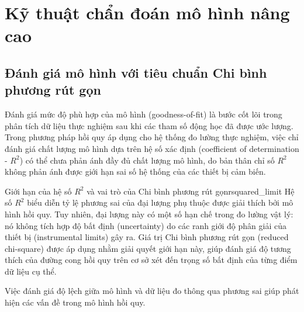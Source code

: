 \chapter{Kỹ thuật chẩn đoán mô hình nâng cao}

\section{Đánh giá mô hình với tiêu chuẩn Chi bình phương rút gọn}
\label{sec:reduced_chi_square}

Đánh giá mức độ phù hợp của mô hình (goodness-of-fit) là bước cốt lõi trong phân tích dữ liệu thực nghiệm sau khi các tham số động học đã được ước lượng. Trong phương pháp hồi quy áp dụng cho hệ thống đo lường thực nghiệm, việc chỉ đánh giá chất lượng mô hình dựa trên hệ số xác định (coefficient of determination - $R^2$) có thể chưa phản ánh đầy đủ chất lượng mô hình, do bản thân chỉ số $R^2$ không phản ánh được giới hạn sai số hệ thống của các thiết bị cảm biến.

\begin{physcore}{Giới hạn của hệ số $R^2$ và vai trò của Chi bình phương rút gọn}{rsquared_limit}
Hệ số $R^2$ biểu diễn tỷ lệ phương sai của đại lượng phụ thuộc được giải thích bởi mô hình hồi quy. Tuy nhiên, đại lượng này có một số hạn chế trong đo lường vật lý: nó không tích hợp độ bất định (uncertainty) do các ranh giới độ phân giải của thiết bị (instrumental limits) gây ra. Giá trị Chi bình phương rút gọn (reduced chi-square) được áp dụng nhằm giải quyết giới hạn này, giúp đánh giá độ tương thích của đường cong hồi quy trên cơ sở xét đến trọng số bất định của từng điểm dữ liệu cụ thể.
\end{physcore}

Việc đánh giá độ lệch giữa mô hình và dữ liệu đo thông qua phương sai giúp phát hiện các vấn đề trong mô hình hồi quy.


